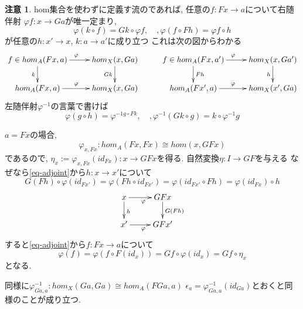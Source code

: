 \documentclass[dvipdfmx,a4paper,11pt]{report}
\theoremstyle{definition}
\newtheorem{rem}[thm]{注意}
\begin{document}
\begin{rem}
hom集合を使わずに定義す流のであれば, 
任意の$f : Fx \to a$について右随伴射
$\varphi f : x \to Ga$が唯一定まり, 
\begin{equation}
\label{eq-adjoint}
\varphi(k \circ f) = Gk \circ \varphi f, \quad, \varphi(f \circ Fh) = \varphi f \circ h 
\end{equation}
が任意の$h : x' \to x$, $k : a \to a'$に成り立つ
これは次の図からわかる
\begin{equation*}
\xymatrix@C=25pt@R=20pt{
f \in hom_{A}(Fx, a) \ar@{->}[d] _{k} \ar@{->}[r]^{\varphi}&  
hom_{X}(x, Ga) \ar@{->}[d]_{Gk}   & 
f \in hom_{A}(Fx, a') \ar@{->}[d]^{Fh} \ar@{->}[r]^{\varphi} &
hom_{X}(x, Ga') \ar@{->}[d]_{h} \\
hom_{A}(Fx, a) 	\ar@{->}[r]^{\varphi} 	 &  
hom_{X}(x, Ga)  & 
hom_{A}(Fx', a)	\ar@{->}[r]^{\varphi} &
hom_{X}(x', Ga) \\
}
\end{equation*}
左随伴射$\varphi^{-1}$の言葉で書けば
$$
\varphi(g \circ h) = \varphi^{-1 g \circ Fk}, \quad, 
\varphi^{-1}(Gk \circ g) = k \circ \varphi^{-1}g
$$
\end{rem}

$a=Fx$の場合, 
$$
\varphi_{x,Fx} : hom_{A}(Fx, Fx) \cong hom(x, GFx)
$$
であるので, $\eta_x := \varphi_{x,Fx}(id_{Fx}) : x \to GFx$を得る.
自然変換$\eta : I \to GF$を与える
なぜなら\ref{eq-adjoint}から$h: x \to x'$について
$$
G(Fh) \circ \varphi(id_{Fx'}) 
=
\varphi( Fh \circ id_{Fx'})
=
\varphi(id_{Fx'} \circ Fh)
=
\varphi(id_{Fx}) \circ h
$$
\begin{equation*}
\xymatrix@C=25pt@R=20pt{
x \ar@{->}[d]^{h}\ar@{->}[r]_{\varphi}&
 GFx\ar@{->}[d]^{G(Fh)}\\
x'\ar@{->}[r]_{\varphi}& 
GFx'\\   
}
\end{equation*}
すると\ref{eq-adjoint}から$f : Fx \to a$について
$$
\varphi(f ) = \varphi(f \circ F(id_{x})) = Gf \circ  \varphi(id_x)= Gf \circ \eta_x
$$
となる.

同様に$\varphi^{-1}_{Ga, a} :  hom_{X}(Ga, Ga) \cong hom_{A}(FGa, a)$
$\epsilon_a = \varphi^{-1}_{Ga, a}(id_{Ga})$とおくと同様のことが成り立つ. 
\end{document}
